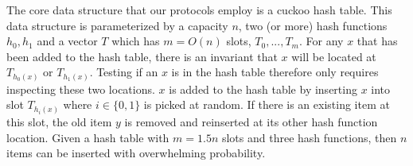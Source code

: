 The core data structure that our protocols employ is a cuckoo hash table. This data structure is parameterized by a capacity $n$, two (or more) hash functions $h_0, h_1$ and a vector $T$ which has $m=O(n)$ slots, $T_0, ..., T_m$. For any $x$ that has been added to the hash table, there is an invariant that $x$ will be located at $T_{h_0(x)}$ or $T_{h_1(x)}$. Testing if an $x$ is in the hash table therefore only requires inspecting these two locations. $x$ is added to the hash table by inserting $x$ into slot $T_{h_i(x)}$ where $i\in \{0,1\}$ is picked at random. If there is an existing item at this slot, the old item $y$ is removed and reinserted at its other hash function location. Given a hash table with $m=1.5n$ slots and three hash functions, then $n$ items can be inserted with overwhelming probability\cite{DRRT18}. 